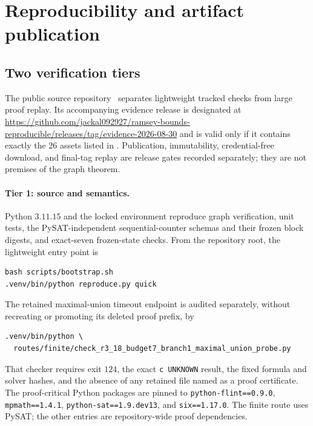 \section{Reproducibility and artifact publication}\label{sec:repro}

\subsection{Two verification tiers}

The public source repository~\cite{Repository2026} separates lightweight
tracked checks from large proof replay.  Its accompanying evidence release is
designated at
\url{https://github.com/jackal092927/ramsey-bounds-reproducible/releases/tag/evidence-2026-08-30}
and is valid only if it contains exactly the 26 assets listed in
.  Publication, immutability,
credential-free download, and final-tag replay are release gates recorded
separately; they are not premises of the graph theorem.

\paragraph{Tier 1: source and semantics.}
Python \(3.11.15\) and the locked environment reproduce graph verification,
unit tests, the PySAT-independent sequential-counter schemas and their frozen
block digests, and exact-seven frozen-state checks.  From the repository root,
the lightweight entry point is
\begingroup\scriptsize
\begin{verbatim}
bash scripts/bootstrap.sh
.venv/bin/python reproduce.py quick
\end{verbatim}
\endgroup
The retained maximal-union timeout endpoint is audited separately, without
recreating or promoting its deleted proof prefix, by
\begingroup\scriptsize
\begin{verbatim}
.venv/bin/python \
  routes/finite/check_r3_18_budget7_branch1_maximal_union_probe.py
\end{verbatim}
\endgroup
That checker requires exit \(124\), the exact \texttt{c UNKNOWN} result, the
fixed formula and solver hashes, and the absence of any retained file named as
a proof certificate.
The proof-critical Python packages are pinned to
\texttt{python-flint==0.9.0}, \texttt{mpmath==1.4.1},
\texttt{python-sat==1.9.dev13}, and \texttt{six==1.17.0}.  The finite route
uses PySAT; the other entries are repository-wide proof dependencies.

